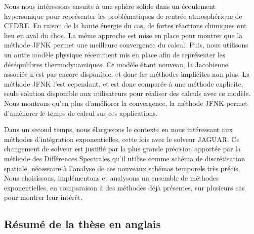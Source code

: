 Nous nous intéressons ensuite à une sphère solide dans un écoulement hypersonique pour représenter les problématiques de rentrée atmosphérique de CEDRE.
En raison de la haute énergie du cas, de fortes réactions chimiques ont lieu en aval du choc.
La même approche est mise en place pour montrer que la méthode JFNK permet une meilleure convergence du calcul.
Puis, nous utilisons un autre modèle physique récemment mis en place afin de représenter les déséquilibres thermodynamiques.
Ce modèle étant nouveau, la Jacobienne associée n'est pas encore disponible, et donc les méthodes implicites non plus.
La méthode JFNK l'est cependant, et est donc comparée à une méthode explicite, seule solution disponible aux utilisateurs pour réaliser des calculs avec ce modèle.
Nous montrons qu'en plus d'améliorer la convergence, la méthode JFNK permet d'améliorer le temps de calcul sur ces applications.

Dans un second temps, nous élargissons le contexte en nous intéressant aux méthodes d'intégration exponentielles, cette fois avec le solveur JAGUAR.
Ce changement de solveur est justifié par la plus grande précision apportée par la méthode des Différences Spectrales qu'il utilise comme schéma de discrétisation spatiale, nécessaire à l'analyse de ces nouveaux schémas temporels très précis.
Nous choisissons, implémentons et analysons un ensemble de méthodes exponentielles, en comparaison à des méthodes déjà présentes, sur plusieurs cas pour montrer leur intérêt.


  \subsection{Résumé de la thèse en anglais}


